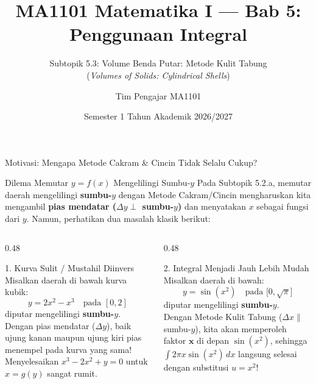 \documentclass[aspectratio=43,10pt]{beamer}
\title[MA1101 Matematika I]{MA1101 Matematika I --- Bab 5: Penggunaan Integral}
\subtitle{Subtopik 5.3: Volume Benda Putar: Metode Kulit Tabung\\(\textit{Volumes of Solids: Cylindrical Shells})}
\author[FMIPA ITB]{Tim Pengajar MA1101}
\institute[ITB]{Fakultas Matematika dan Ilmu Pengetahuan Alam\\Institut Teknologi Bandung}
\date{Semester 1 Tahun Akademik 2026/2027}
\begin{document}
\begin{frame}
    \titlepage
\end{frame}

\begin{frame}{Motivasi: Mengapa Metode Cakram \& Cincin Tidak Selalu Cukup?}
    \begin{block}{Dilema Memutar $y = f(x)$ Mengelilingi Sumbu-$y$}
        \scriptsize
        Pada Subtopik 5.2.a, memutar daerah mengelilingi \textbf{sumbu-$y$} dengan Metode Cakram/Cincin mengharuskan kita mengambil \textbf{pias mendatar ($\Delta y \perp$ sumbu-$y$)} dan menyatakan $x$ sebagai fungsi dari $y$. Namun, perhatikan dua masalah klasik berikut:
    \end{block}

    \begin{columns}[T]
        \begin{column}{0.48\textwidth}
            \begin{alertblock}{1. Kurva Sulit / Mustahil Diinvers}
                \scriptsize
                Misalkan daerah di bawah kurva kubik:
                $$y = 2x^2 - x^3 \quad\text{pada } [0, 2]$$
                diputar mengelilingi \textbf{sumbu-$y$}.\\
                \vskip 2pt
                Dengan pias mendatar ($\Delta y$), baik ujung kanan maupun ujung kiri pias menempel pada kurva yang sama! Menyelesaikan $x^3 - 2x^2 + y = 0$ untuk $x = g(y)$ sangat rumit.
            \end{alertblock}
        \end{column}

        \begin{column}{0.48\textwidth}
            \begin{exampleblock}{2. Integral Menjadi Jauh Lebih Mudah}
                \scriptsize
                Misalkan daerah di bawah:
                $$y = \sin(x^2) \quad\text{pada } \big[0, \sqrt{\pi}\big]$$
                diputar mengelilingi \textbf{sumbu-$y$}.\\
                \vskip 2pt
                Dengan Metode Kulit Tabung ($\Delta x \parallel$ sumbu-$y$), kita akan memperoleh faktor $\mathbf{x}$ di depan $\sin(x^2)$, sehingga $\int 2\pi x\sin(x^2)\,dx$ langsung selesai dengan substitusi $u = x^2$!
            \end{exampleblock}
        \end{column}
    \end{columns}
\end{frame}
\end{document}
